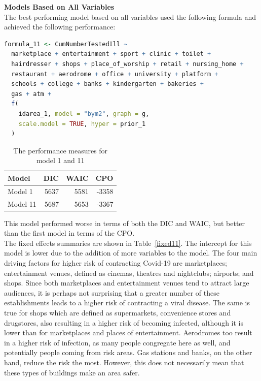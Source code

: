 \textbf{Models Based on All Variables} \\
The best performing model based on all variables used the following formula and achieved the following performance:
\begin{lstlisting}[language=R]
formula_11 <- CumNumberTestedIll ~
  marketplace + entertainment + sport + clinic + toilet +
  hairdresser + shops + place_of_worship + retail + nursing_home +
  restaurant + aerodrome + office + university + platform +
  schools + college + banks + kindergarten + bakeries +
  gas + atm +
  f(
    idarea_1, model = "bym2", graph = g,
    scale.model = TRUE, hyper = prior_1
  )
\end{lstlisting}
\begin{table}[H] 
\caption{The performance measures for model 1 and 11\label{model11}}
\begin{tabular}{l r r r}
\toprule
\textbf{Model}	& \textbf{DIC}	& \textbf{WAIC} & \textbf{CPO} \\
\midrule
Model 1 & 5637 & 5581 & -3358 \\
Model 11 & 5687 & 5653 & -3367 \\
\bottomrule
\end{tabular}
\end{table}
This model performed worse in terms of both the DIC and WAIC, but better than the first model in terms of the CPO. \\
The fixed effects summaries are shown in Table~\ref{fixed11}. The intercept for this model is lower due to the addition of more variables to the model. The four main driving factors for higher risk of contracting Covid-19 are marketplaces; entertainment venues, defined as cinemas, theatres and nightclubs; airports; and shops. Since both marketplaces and entertainment venues tend to attract large audiences, it is perhaps not surprising that a greater number of these establishments leads to a higher risk of contracting a viral disease. The same is true for shops which are defined as supermarkets, convenience stores and drugstores, also resulting in a higher risk of becoming infected, although it is lower than for marketplaces and places of entertainment. Aerodromes too result in a higher risk of infection, as many people congregate here as well, and potentially people coming from risk areas. Gas stations and banks, on the other hand, reduce the risk the most. However, this does not necessarily mean that these types of buildings make an area safer.
